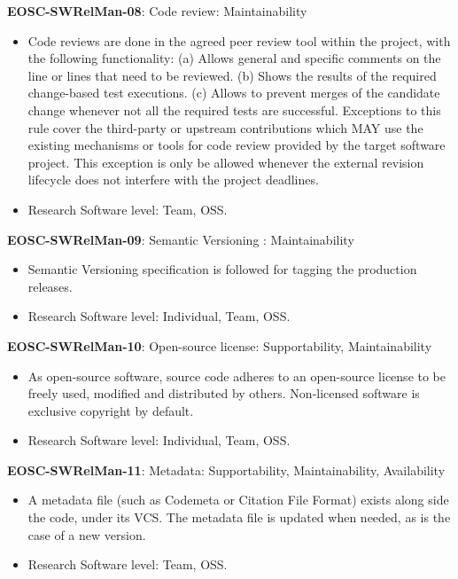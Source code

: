 \textbf{EOSC-SWRelMan-08}: Code review: Maintainability

\begin{itemize}
    \item Code reviews are done in the agreed peer review tool within the project, with the following  functionality: (a) Allows general and specific comments on the line or lines that need to be reviewed. (b) Shows the results of the required change-based test executions. (c) Allows to prevent merges of the candidate change whenever not all the required tests are successful. Exceptions to this rule cover the third-party or upstream contributions which MAY use the existing mechanisms or tools for code review provided by the target software project. This exception is only be allowed whenever the external revision lifecycle does not interfere with the project deadlines.~\cite{srisopha_software_2018,aberdour_achieving_2007,zuser_software_2005,orviz_set_2017}
    \item Research Software level: Team, OSS.
\end{itemize}

\textbf{EOSC-SWRelMan-09}: Semantic Versioning : Maintainability

\begin{itemize}
    \item Semantic Versioning specification is followed for tagging the production releases.~\cite{orviz_set_2017,raymond_software_2013}
    \item Research Software level: Individual, Team, OSS.
\end{itemize}

\textbf{EOSC-SWRelMan-10}: Open-source license: Supportability, Maintainability

\begin{itemize}
    \item As open-source software, source code adheres to an open-source license to be freely used, modified and distributed by others. Non-licensed software is exclusive copyright by default.~\cite{orviz_set_2017,raymond_software_2013}
    \item Research Software level: Individual, Team, OSS.
\end{itemize}

\textbf{EOSC-SWRelMan-11}: Metadata: Supportability, Maintainability, Availability

\begin{itemize}
    \item A metadata file (such as Codemeta or Citation File Format) exists along side the code, under its VCS. The metadata file is updated when needed, as is the case of a new version.~\cite{orviz_set_2017}
    \item Research Software level: Team, OSS.
\end{itemize}

